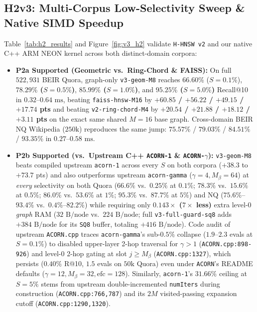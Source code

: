 \documentclass[conference]{IEEEtran}
\begin{document}
\subsection{H2v3: Multi-Corpus Low-Selectivity Sweep \& Native SIMD Speedup}
\label{sec:eval_h2}

Table~\ref{tab:h2_results} and Figure~\ref{fig:v3_h2} validate \texttt{H-HNSW v2} and our native C++ ARM NEON kernel across both distinct-domain corpora:
\begin{itemize}
    \item \textbf{P2a Supported (Geometric vs.\ Ring-Chord \& FAISS):} On full $522{,}931$ BEIR Quora, graph-only \texttt{v3-geom-M8} reaches $66.60\%$ ($S=0.1\%$), \textbf{$78.29\%$ ($S=0.5\%$)}, \textbf{$85.99\%$ ($S=1.0\%$)}, and \textbf{$95.25\%$ ($S=5.0\%$)} Recall@10 in $0.32$--$0.64\text{ ms}$, beating \texttt{faiss-hnsw-M16} by \textbf{$+60.85$ / $+56.22$ / $+49.15$ / $+17.74$ pts} and beating \texttt{v2-ring-chord-M4} by \textbf{$+20.54$ / $+21.88$ / $+18.12$ / $+3.11$ pts} on the exact same shared $M=16$ base graph. Cross-domain BEIR NQ Wikipedia ($250\text{k}$) reproduces the same jump: $75.57\%$ / $79.03\%$ / $84.51\%$ / $93.35\%$ in $0.27$--$0.58\text{ ms}$.
    \item \textbf{P2b Supported (vs.\ Upstream C++ \texttt{ACORN-1} \& \texttt{ACORN-$\gamma$}):} \texttt{v3-geom-M8} beats compiled upstream \texttt{acorn-1} across every $S$ on both corpora ($+38.3$ to $+73.7$ pts) and also outperforms upstream \texttt{acorn-gamma} ($\gamma=4, M_\beta=64$) at \textit{every} selectivity on both Quora ($66.6\%$ vs.\ $0.25\%$ at $0.1\%$; $78.3\%$ vs.\ $15.6\%$ at $0.5\%$; $86.0\%$ vs.\ $53.6\%$ at $1\%$; $95.3\%$ vs.\ $87.7\%$ at $5\%$) and NQ ($75.6\%$--$93.4\%$ vs.\ $0.4\%$--$82.2\%$) while requiring only \textbf{$0.143\times$ ($7\times$ less)} extra level-0 \textit{graph} RAM ($32\text{ B/node}$ vs.\ $224\text{ B/node}$; full \texttt{v3-full-guard-sq8} adds $+384\text{ B/node}$ for its \texttt{SQ8} buffer, totaling $+416\text{ B/node}$). Code audit of upstream \texttt{ACORN.cpp} traces \texttt{acorn-gamma}'s sub-$0.5\%$ collapse ($1.9$--$2.3$ evals at $S=0.1\%$) to disabled upper-layer 2-hop traversal for $\gamma>1$ (\texttt{ACORN.cpp:898-926}) and level-0 2-hop gating at slot $j \ge M_\beta$ (\texttt{ACORN.cpp:1327}), which persists ($0.40\%$ R@10, $1.5$ evals on $50\text{k}$ Quora) even under \texttt{ACORN}'s README defaults ($\gamma=12, M_\beta=32, \text{efc}=128$). Similarly, \texttt{acorn-1}'s $31.66\%$ ceiling at $S=5\%$ stems from upstream double-incremented \texttt{numIters} during construction (\texttt{ACORN.cpp:766,787}) and its $2M$ visited-passing expansion cutoff (\texttt{ACORN.cpp:1290,1320}).

\end{itemize}
\end{document}
